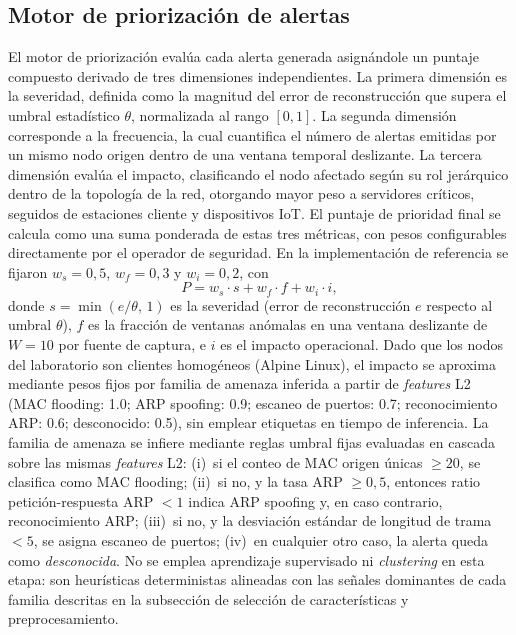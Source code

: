 \documentclass[conference]{IEEEtran}
\newcommand{\arpspoof}{ARP spoofing}
\newcommand{\macflood}{MAC flooding}
\newcommand{\portscan}{escaneo de puertos}
\newcommand{\arprecon}{reconocimiento ARP}
\begin{document}
\subsection{Motor de priorización de alertas}
El motor de priorización evalúa cada alerta generada asignándole un
puntaje compuesto derivado de tres dimensiones independientes. La
primera dimensión es la severidad, definida como la magnitud del error
de reconstrucción que supera el umbral estadístico $\theta$, normalizada
al rango $[0,1]$. La segunda dimensión corresponde a la frecuencia, la
cual cuantifica el número de alertas emitidas por un mismo nodo origen
dentro de una ventana temporal deslizante. La tercera dimensión evalúa
el impacto, clasificando el nodo afectado según su rol jerárquico dentro
de la topología de la red, otorgando mayor peso a servidores críticos,
seguidos de estaciones cliente y dispositivos IoT. El puntaje de prioridad final se calcula como una suma ponderada de estas tres
métricas, con pesos configurables directamente por el operador de
seguridad. En la implementación de referencia se fijaron
$w_s=0{,}5$, $w_f=0{,}3$ y $w_i=0{,}2$, con
\begin{equation}
\label{eq:priority}
P = w_s \cdot s + w_f \cdot f + w_i \cdot i,
\end{equation}
donde $s=\min(e/\theta,\,1)$ es la severidad (error de reconstrucción $e$
respecto al umbral $\theta$), $f$ es la fracción de ventanas anómalas en
una ventana deslizante de $W{=}10$ por fuente de captura, e $i$ es el
impacto operacional. Dado que los nodos del laboratorio son clientes
homogéneos (Alpine Linux), el impacto se aproxima mediante pesos fijos
por familia de amenaza inferida a partir de \textit{features} L2
(\macflood: 1.0; \arpspoof: 0.9; \portscan: 0.7;
\arprecon: 0.6; desconocido: 0.5), sin emplear etiquetas
en tiempo de inferencia. La familia de amenaza se infiere mediante reglas
umbral fijas evaluadas en cascada sobre las mismas \textit{features} L2:
(i)~si el conteo de MAC origen únicas $\geq 20$, se clasifica como
\macflood; (ii)~si no, y la tasa ARP $\geq 0{,}5$, entonces
ratio petición-respuesta ARP $< 1$ indica \arpspoof{} y, en caso
contrario, \arprecon; (iii)~si no, y la desviación estándar de longitud
de trama $< 5$, se asigna \portscan; (iv)~en cualquier otro caso, la alerta queda
como \textit{desconocida}. No se emplea aprendizaje supervisado ni
\textit{clustering} en esta etapa: son heurísticas deterministas alineadas
con las señales dominantes de cada familia descritas en la subsección de
selección de características y preprocesamiento.
\end{document}
